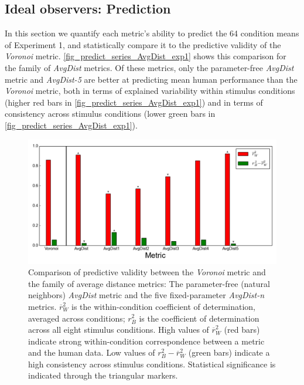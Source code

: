 \documentclass[12pt]{article}
\begin{document}
\subsection{Ideal observers: Prediction}

In this section we quantify each metric's ability to predict the 64 condition means of Experiment 1, and statistically compare it to the predictive validity of the \textit{Voronoi} metric. \autoref{fig_predict_series_AvgDist_exp1} shows this comparison for the family of \textit{AvgDist} metrics. Of these metrics, only the parameter-free \textit{AvgDist} metric and \textit{AvgDist-5} are better at predicting mean human performance than the \textit{Voronoi} metric, both in terms of explained variability within stimulus conditions (higher red bars in \autoref{fig_predict_series_AvgDist_exp1}) and in terms of consistency across stimulus conditions (lower green bars in \autoref{fig_predict_series_AvgDist_exp1}).\\

\begin{figure}
\includegraphics{Figures/FIG_SUP_predict_series_AvgDist_exp1.png}
\caption{Comparison of predictive validity between the \emph{Voronoi} metric and the family of average distance metrics: The parameter-free (natural neighbors) \emph{AvgDist} metric and the five fixed-parameter \emph{AvgDist-n} metrics. $\overline{r}^{2}_W$ is the within-condition coefficient of determination, averaged across conditions; $r^{2}_B$ is the coefficient of determination across all eight stimulus conditions. High values of $\overline{r}^{2}_W$ (red bars) indicate strong within-condition correspondence between a metric and the human data. Low values of $r^{2}_B -\overline{r}^{2}_W$ (green bars) indicate a high consistency across stimulus conditions. Statistical significance is indicated through the triangular markers.}
\label{fig_predict_series_AvgDist_exp1}
\end{figure}
\end{document}
